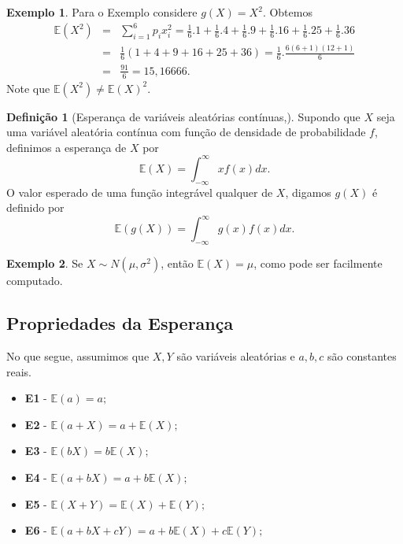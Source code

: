 \documentclass[
]{book}
\theoremstyle{definition}
\newtheorem{definition}{Definição}[chapter]
\theoremstyle{definition}
\newtheorem{example}{Exemplo}[chapter]
\theoremstyle{definition}
\theoremstyle{remark}
\begin{document}
\begin{example}
\protect\hypertarget{exm:exemploEspdado2}{}{\label{exm:exemploEspdado2} }Para o Exemplo \label{exemplo_Esp_dado} considere
\(g(X)=X^2.\) Obtemos
\begin{eqnarray*}
\mathbb{E}(X^2)&=&\sum_{i=1}^6p_ix_i^2= \frac{1}{6}.1+\frac{1}{6}.4+\frac{1}{6}.9+\frac{1}{6}.16+\frac{1}{6}.25+\frac{1}{6}.36\\
     &=&\frac{1}{6}(1+4+9+16+25+36)=\frac{1}{6}.\frac{6(6+1)(12+1)}{6}\\
     &=&\frac{91}{6}=15,16666.
\end{eqnarray*}
Note que \(\mathbb{E}(X^2)\neq \mathbb{E}(X)^2\).
\end{example}

\begin{definition}[Esperança de variáveis aleatórias contínuas,]
\protect\hypertarget{def:defexc}{}{\label{def:defexc} {} }Supondo que \(X\) seja uma variável aleatória contínua com função de densidade de probabilidade \(f\), definimos a esperança de \(X\) por
\[\mathbb{E}(X)=\int_{-\infty}^{\infty}xf(x)dx.\]
O valor esperado de uma função integrável qualquer de \(X\), digamos \(g(X)\) é definido por
\[\mathbb{E}(g(X))=\int_{-\infty}^{\infty}g(x)f(x)dx.\]
\end{definition}

\begin{example}
\protect\hypertarget{exm:exmmeanNormal}{}{\label{exm:exmmeanNormal} } Se \(X\sim N(\mu,\sigma^2)\), então \(\mathbb{E}(X)=\mu\), como pode ser facilmente computado.
\end{example}

\hypertarget{propriedades-da-esperanuxe7a}{%
\subsection{Propriedades da Esperança}\label{propriedades-da-esperanuxe7a}}

No que segue, assumimos que \(X, Y\) são variáveis aleatórias e \(a, b, c\) são constantes reais.

\begin{itemize}
\item
  \textbf{E1} - \(\mathbb{E}(a) = a;\)
\item
  \textbf{E2} - \(\mathbb{E}(a + X) = a + \mathbb{E}(X);\)
\item
  \textbf{E3} - \(\mathbb{E}(b X) = b \mathbb{E}(X);\)
\item
  \textbf{E4} - \(\mathbb{E}(a + b X) = a + b \mathbb{E}(X);\)
\item
  \textbf{E5} - \(\mathbb{E}(X + Y) = \mathbb{E}(X) + \mathbb{E}(Y);\)
\item
  \textbf{E6} - \(\mathbb{E}(a + bX + cY) = a + b \mathbb{E}(X) + c \mathbb{E}(Y);\)
\end{itemize}
\end{document}
